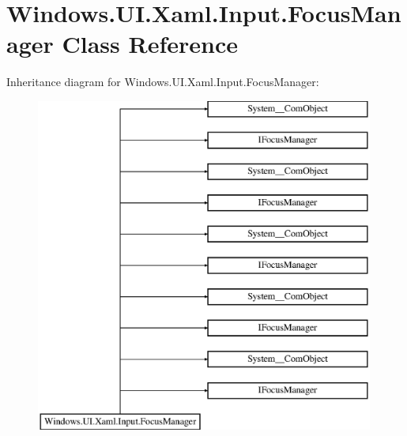 \hypertarget{class_windows_1_1_u_i_1_1_xaml_1_1_input_1_1_focus_manager}{}\section{Windows.\+U\+I.\+Xaml.\+Input.\+Focus\+Manager Class Reference}
\label{class_windows_1_1_u_i_1_1_xaml_1_1_input_1_1_focus_manager}
Inheritance diagram for Windows.\+U\+I.\+Xaml.\+Input.\+Focus\+Manager\+:\begin{figure}[H]
\begin{center}
\leavevmode
\includegraphics[height=11.000000cm]{class_windows_1_1_u_i_1_1_xaml_1_1_input_1_1_focus_manager}
\end{center}
\end{figure}
